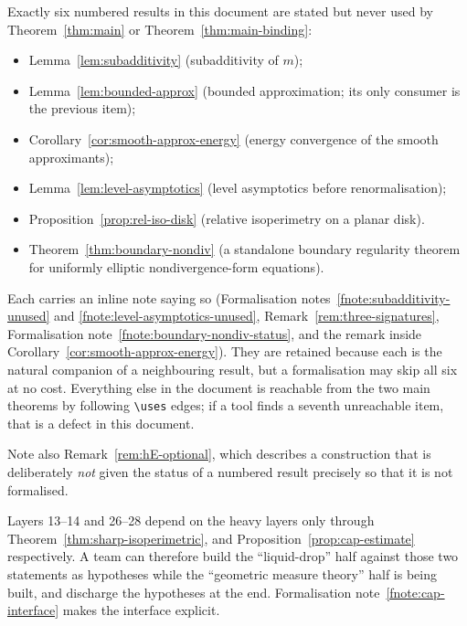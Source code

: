 \begin{fnote}\label{fnote:off-critical-path}
Exactly six numbered results in this document are stated but never used by
Theorem~\ref{thm:main} or Theorem~\ref{thm:main-binding}:
\begin{itemize}[nosep]
\item Lemma~\ref{lem:subadditivity} (subadditivity of $m$);
\item Lemma~\ref{lem:bounded-approx} (bounded approximation; its only consumer
  is the previous item);
\item Corollary~\ref{cor:smooth-approx-energy} (energy convergence of the
  smooth approximants);
\item Lemma~\ref{lem:level-asymptotics} (level asymptotics before
  renormalisation);
\item Proposition~\ref{prop:rel-iso-disk} (relative isoperimetry on a planar
  disk).
\item Theorem~\ref{thm:boundary-nondiv} (a standalone boundary regularity
  theorem for uniformly elliptic nondivergence-form equations).
\end{itemize}
Each carries an inline note saying so (Formalisation
notes~\ref{fnote:subadditivity-unused} and
\ref{fnote:level-asymptotics-unused}, Remark~\ref{rem:three-signatures},
Formalisation note~\ref{fnote:boundary-nondiv-status}, and the remark inside
Corollary~\ref{cor:smooth-approx-energy}).  They are
retained because each is the natural companion of a neighbouring result, but a
formalisation may skip all six at no cost.  Everything else in the document is
reachable from the two main theorems by following \verb|\uses| edges; if a tool
finds a seventh unreachable item, that is a defect in this document.

Note also Remark~\ref{rem:hE-optional}, which describes a construction that is
deliberately \emph{not} given the status of a numbered result precisely so that
it is not formalised.
\end{fnote}

\begin{fnote}\label{fnote:parallel-tracks}
Layers 13--14 and 26--28 depend on the heavy layers only through
Theorem~\ref{thm:sharp-isoperimetric}, and
Proposition~\ref{prop:cap-estimate} respectively.  A team can therefore build
the ``liquid-drop'' half against those two statements as hypotheses while the
``geometric measure theory'' half is being built, and discharge the hypotheses
at the end.  Formalisation note~\ref{fnote:cap-interface} makes the interface
explicit.
\end{fnote}


